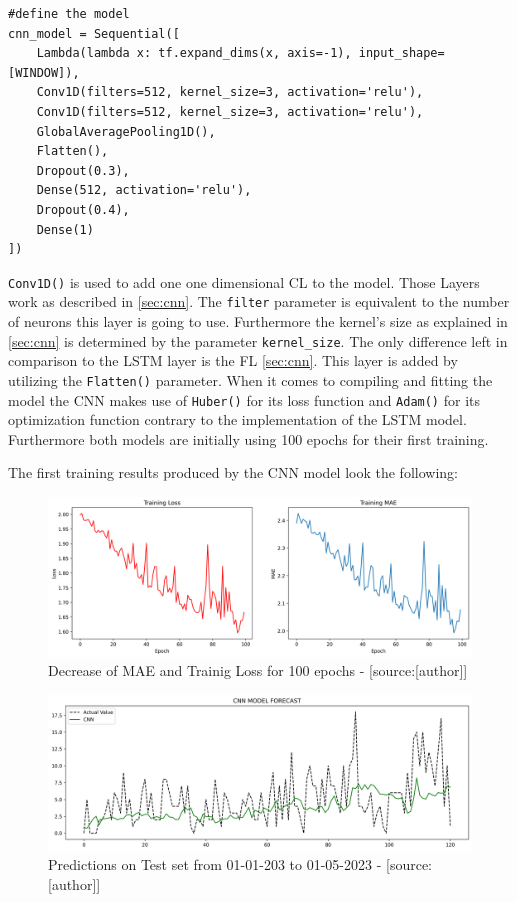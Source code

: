  \begin{lstlisting}
#define the model 
cnn_model = Sequential([
    Lambda(lambda x: tf.expand_dims(x, axis=-1), input_shape=[WINDOW]),
    Conv1D(filters=512, kernel_size=3, activation='relu'),
    Conv1D(filters=512, kernel_size=3, activation='relu'),
    GlobalAveragePooling1D(),
    Flatten(),
    Dropout(0.3),
    Dense(512, activation='relu'),
    Dropout(0.4),
    Dense(1)
])
\end{lstlisting}
\verb|Conv1D()| is used to add one one dimensional CL to the model. Those Layers work as described in \ref{sec:cnn}.  The \verb|filter| parameter is equivalent to the number of neurons this layer is going to use. Furthermore the kernel's size as explained in \ref{sec:cnn} is determined by the parameter \verb|kernel_size|.
The only difference left in comparison to the LSTM layer is the FL \ref{sec:cnn}. This layer is added by utilizing the \verb|Flatten()| parameter. When it comes to compiling and fitting the model the CNN makes use of  \verb|Huber()| for its loss function and \verb|Adam()| for its optimization function contrary to the implementation of the LSTM model. Furthermore both models are initially using 100 epochs for their first training. \newline

The first training results produced by the CNN model look the following: 

\begin{figure}[H]
	\centering
		\includegraphics[width=14cm]{images/cnn_1_mae}
	\caption{Decrease of MAE and Trainig Loss for 100 epochs - [source:[author]]}
	\label{fig:training_test}
\end{figure}

\begin{figure}[H]
	\centering
		\includegraphics[width=14cm]{images/cnn_1_prediction}
	\caption{Predictions on Test set from 01-01-203 to 01-05-2023 - [source:[author]]}
	\label{fig:lstm_1_training_test}
\end{figure}

